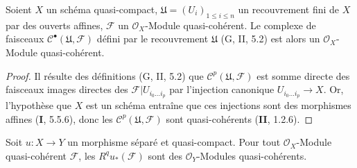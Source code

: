 \begin{lemma}[1.4.9]
\label{III.1.4.9-fr}
Soient $X$ un schéma quasi-compact,
$\mathfrak U=(U_i)_{1\leq i\leq n}$ un recouvrement fini de $X$ par des
ouverts affines, $\mathcal F$ un $\mathcal O_X$-Module quasi-cohérent. Le
complexe de faisceaux $\mathcal C^\bullet(\mathfrak U,\mathcal F)$ défini
par le recouvrement $\mathfrak U$ \textup{(G, II, 5.2)} est alors un
$\mathcal O_X$-Module quasi-cohérent.
\end{lemma}

\begin{proof}
Il résulte des définitions (G, II, 5.2) que
$\mathcal C^p(\mathfrak U,\mathcal F)$ est somme directe des faisceaux
images directes des $\mathcal F\vert U_{i_0\ldots i_p}$ par l'injection
canonique $U_{i_0\ldots i_p}\to X$. Or, l'hypothèse que $X$ est un schéma
entraîne que ces injections sont des morphismes affines (\textbf{I}, 5.5.6), donc les
$\mathcal C^p(\mathfrak U,\mathcal F)$ sont quasi-cohérents (\textbf{II}, 1.2.6).
\end{proof}

\begin{proposition}[1.4.10]
\label{III.1.4.10-fr}
Soit $u:X\to Y$ un morphisme séparé et quasi-compact. Pour tout
$\mathcal O_X$-Module quasi-cohérent $\mathcal F$, les
$R^qu_*(\mathcal F)$ sont des $\mathcal O_Y$-Modules quasi-cohérents.
\end{proposition}

